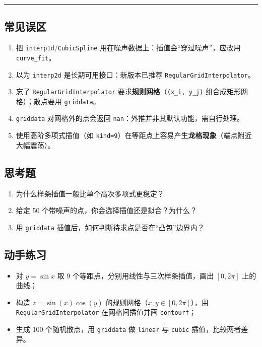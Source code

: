 \begin{center}\rule{0.5\linewidth}{0.5pt}\end{center}

\subsection{常见误区}\label{ux5e38ux89c1ux8befux533a-9}

\begin{enumerate}
\def\labelenumi{\arabic{enumi}.}
\tightlist
\item
  把 \texttt{interp1d}/\texttt{CubicSpline}
  用在噪声数据上：插值会``穿过噪声''，应改用 \texttt{curve\_fit}。
\item
  以为 \texttt{interp2d} 是长期可用接口：新版本已推荐
  \texttt{RegularGridInterpolator}。
\item
  忘了 \texttt{RegularGridInterpolator}
  要求\textbf{规则网格}（\texttt{(x\_i,\ y\_j)}
  组合成矩形网格）；散点要用 \texttt{griddata}。
\item
  \texttt{griddata} 对网格外的点会返回
  \texttt{nan}：外推并非其默认功能，需自行处理。
\item
  使用高阶多项式插值（如
  \texttt{kind=9}）在等距点上容易产生\textbf{龙格现象}（端点附近大幅震荡）。
\end{enumerate}

\subsection{思考题}\label{ux601dux8003ux9898-11}

\begin{enumerate}
\def\labelenumi{\arabic{enumi}.}
\tightlist
\item
  为什么样条插值一般比单个高次多项式更稳定？
\item
  给定 50 个带噪声的点，你会选择插值还是拟合？为什么？
\item
  用 \texttt{griddata} 插值后，如何判断待求点是否在``凸包''边界内？
\end{enumerate}

\subsection{动手练习}\label{ux52a8ux624bux7ec3ux4e60-2}

\begin{itemize}
\tightlist
\item
  对 \(y=\sin x\) 取 9 个等距点，分别用线性与三次样条插值，画出
  \([0,2\pi]\) 上的曲线；
\item
  构造 \(z=\sin(x)\cos(y)\) 的规则网格（\(x,y\in[0,2\pi]\)），用
  \texttt{RegularGridInterpolator} 在网格间插值并画 \texttt{contourf}；
\item
  生成 100 个随机散点，用 \texttt{griddata} 做 \texttt{linear} 与
  \texttt{cubic} 插值，比较两者差异。
\end{itemize}

